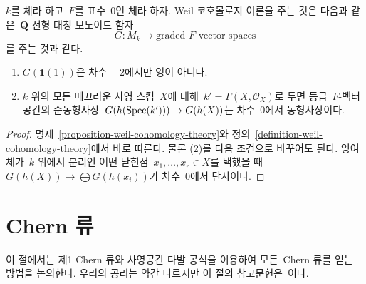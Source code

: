 \begin{proposition}
\label{proposition-weil-cohomology-theory-again}
$k$를 체라 하고\  $F$를 표수\  $0$인 체라 하자. Weil 코호몰로지 이론을
주는 것은 다음과 같은\  $\mathbf{Q}$-선형 대칭 모노이드 함자
$$
G : M_k \longrightarrow \text{graded }F\text{-vector spaces}
$$
를 주는 것과 같다.
\begin{enumerate}
\item $G(\mathbf{1}(1))$은 차수\  $-2$에서만 영이 아니다.
\item $k$ 위의 모든 매끄러운 사영 스킴\  $X$에 대해\ 
$k' = \Gamma(X, \mathcal{O}_X)$로 두면 등급\  $F$-벡터공간의 준동형사상\ 
$G(h(\mathop{\mathrm{Spec}}(k'))) \to G(h(X))$는 차수\  $0$에서 동형사상이다.
\end{enumerate}
\end{proposition}

\begin{proof}
명제\  \ref{proposition-weil-cohomology-theory}와 정의\ 
\ref{definition-weil-cohomology-theory}에서 바로 따른다. 물론
(2)를 다음 조건으로 바꾸어도 된다. 잉여체가\  $k$ 위에서 분리인
어떤 닫힌점\  $x_1, \ldots, x_r \in X$를 택했을 때\ 
$G(h(X)) \to \bigoplus G(h(x_i))$가 차수\  $0$에서 단사이다.
\end{proof}







\section{Chern 류}
\label{section-chern}

\noindent
이 절에서는 제1 Chern 류와 사영공간 다발 공식을 이용하여 모든\ 
Chern 류를 얻는 방법을 논의한다. 우리의 공리는 약간 다르지만 이
절의 참고문헌은\  \cite{Grothendieck-chern}이다.

